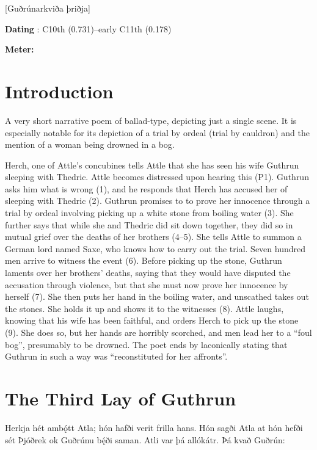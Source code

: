 [Guðrúnarkviða þriðja]
\def\thisBookCode{GudrunThree}

\begin{flushright}%
\textbf{Dating} \parencite{Sapp2022}: C10th (0.731)–early C11th (0.178)

\textbf{Meter:} \Fornyrdislag%
\end{flushright}

\section{Introduction}

A very short narrative poem of ballad-type, depicting just a single scene.  It is especially notable for its depiction of a trial by ordeal (trial by cauldron) and the mention of a woman being drowned in a bog.

Herch, one of Attle’s concubines tells Attle that she has seen his wife Guthrun sleeping with Thedric. Attle becomes distressed upon hearing this (P1). Guthrun asks him what is wrong (1), and he responds that Herch has accused her of sleeping with Thedric (2). Guthrun promises to to prove her innocence through a trial by ordeal involving picking up a white stone from boiling water (3). She further says that while she and Thedric did sit down together, they did so in mutual grief over the deaths of her brothers (4–5). She tells Attle to summon a German lord named Saxe, who knows how to carry out the trial. Seven hundred men arrive to witness the event (6). Before picking up the stone, Guthrun laments over her brothers’ deaths, saying that they would have disputed the accusation through violence, but that she must now prove her innocence by herself (7). She then puts her hand in the boiling water, and unscathed takes out the stones. She holds it up and shows it to the witnesses (8). Attle laughs, knowing that his wife has been faithful, and orders Herch to pick up the stone (9). She does so, but her hands are horribly scorched, and men lead her to a “foul bog”, presumably to be drowned. The poet ends by laconically stating that Guthrun in such a way was “reconstituted for her affronts”.

\sectionline

\section{The Third Lay of Guthrun}

\bpg\bpa Herkja hét ambǫ́tt Atla; hón hafði verit frilla hans. Hón sagði Atla at hón hefði sét Þjóðrek ok Guðrúnu bę́ði saman. Atli var þá allókátr. Þá kvað Guðrún:\epa

